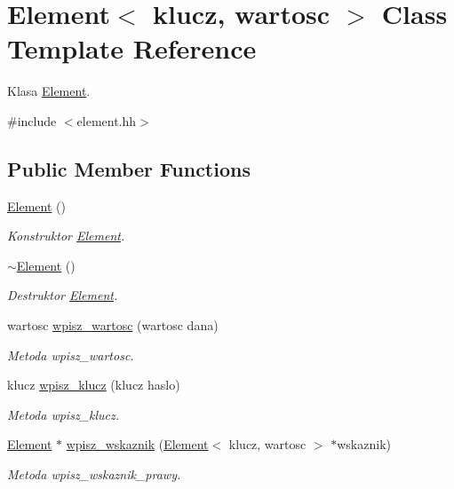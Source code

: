 \hypertarget{class_element}{\section{Element$<$ klucz, wartosc $>$ Class Template Reference}
\label{class_element}
}


Klasa \hyperlink{class_element}{Element}.  




{\ttfamily \#include $<$element.\-hh$>$}

\subsection*{Public Member Functions}
\begin{DoxyCompactItemize}
\item 
\hyperlink{class_element_a2908ce7965da27acf29ba7a8ed702a9e}{Element} ()
\begin{DoxyCompactList}\small\item\em Konstruktor \hyperlink{class_element}{Element}. \end{DoxyCompactList}\item 
\hyperlink{class_element_a35ad2ab7777b71252bc38005c6370785}{$\sim$\-Element} ()
\begin{DoxyCompactList}\small\item\em Destruktor \hyperlink{class_element}{Element}. \end{DoxyCompactList}\item 
wartosc \hyperlink{class_element_a9e53cf7a1b06c07beabd972d31d2d9f9}{wpisz\-\_\-wartosc} (wartosc dana)
\begin{DoxyCompactList}\small\item\em Metoda wpisz\-\_\-wartosc. \end{DoxyCompactList}\item 
klucz \hyperlink{class_element_a51aa3e750ac6c3c99b5a5d536ec0a316}{wpisz\-\_\-klucz} (klucz haslo)
\begin{DoxyCompactList}\small\item\em Metoda wpisz\-\_\-klucz. \end{DoxyCompactList}\item 
\hyperlink{class_element}{Element} $\ast$ \hyperlink{class_element_afb77edb4627167ee735643c56a91ca39}{wpisz\-\_\-wskaznik} (\hyperlink{class_element}{Element}$<$ klucz, wartosc $>$ $\ast$wskaznik)
\begin{DoxyCompactList}\small\item\em Metoda wpisz\-\_\-wskaznik\-\_\-prawy. \end{DoxyCompactList}\item 

\end{DoxyCompactItemize}
